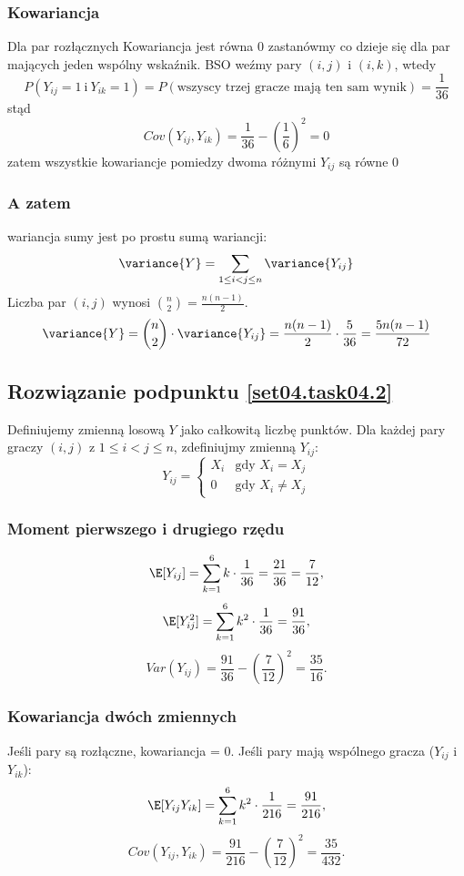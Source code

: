 \subsubsection*{Kowariancja}
Dla par rozłącznych Kowariancja jest równa 0 zastanówmy co dzieje się dla par mających jeden wspólny wskaźnik.
BSO weźmy pary \((i, j)\) i \((i, k)\), wtedy
\[P(Y_{ij} = 1\ \text{i}\ Y_{ik} = 1) = P(\text{wszyscy trzej gracze mają ten sam wynik}) = \frac{1}{36}\]
stąd
\[Cov(Y_{ij}, Y_{ik}) = \frac{1}{36} - (\frac{1}{6})^2 = 0 \]
zatem wszystkie kowariancje pomiedzy dwoma różnymi \(Y_{ij}\) są równe \(0\)
\subsubsection{A zatem}
wariancja sumy jest po prostu sumą wariancji:
\[\variance{Y} = \sum_{1 \le i < j \le n} \variance{Y_{ij}}\]
Liczba par \((i, j)\) wynosi \(\binom{n}{2} = \frac{n(n-1)}{2}\).
\[\variance{Y} = \binom{n}{2} \cdot \variance{Y_{ij}} = \frac{n(n-1)}{2} \cdot \frac{5}{36} = \frac{5n(n-1)}{72}\]


\subsection*{Rozwiązanie podpunktu \ref{set04.task04.2}}
Definiujemy zmienną losową \(Y\) jako całkowitą liczbę punktów.
Dla każdej pary graczy \((i, j)\) z \(1 \le i < j \le n\), zdefiniujmy zmienną \(Y_{ij}\):
\[Y_{ij} = \begin{cases} X_i & \text{gdy } X_i = X_j \\ 0 & \text{gdy } X_i \neq X_j \end{cases}\]

\subsubsection*{Moment pierwszego i drugiego rzędu}
\[
	\E[Y_{ij}] = \sum_{k=1}^{6} k \cdot \frac{1}{36} = \frac{21}{36} = \frac{7}{12},
\]
\[
	\E[Y_{ij}^2] = \sum_{k=1}^{6} k^2 \cdot \frac{1}{36} = \frac{91}{36},
\]
\[
	Var(Y_{ij}) = \frac{91}{36} - \left(\frac{7}{12}\right)^2 = \frac{35}{16}.
\]

\subsubsection*{Kowariancja dwóch zmiennych}
Jeśli pary są rozłączne, kowariancja = 0.
Jeśli pary mają wspólnego gracza (\(Y_{ij}\) i \(Y_{ik}\)):
\[
	\E[Y_{ij}Y_{ik}] = \sum_{k=1}^{6} k^2 \cdot \frac{1}{216} = \frac{91}{216},
\]
\[
	Cov(Y_{ij}, Y_{ik}) = \frac{91}{216} - \left(\frac{7}{12}\right)^2 = \frac{35}{432}.
\]

